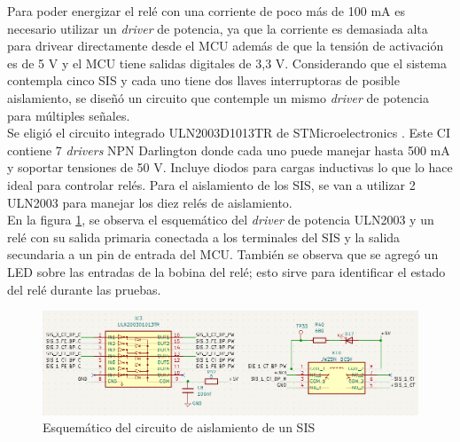 Para poder energizar el relé con una corriente de poco más de 100 mA es necesario utilizar un \textit{driver} de potencia, ya que la corriente es demasiada alta para drivear directamente desde el MCU además de que la tensión de activación es de 5 V y el MCU tiene salidas digitales de 3,3 V. Considerando que el sistema contempla cinco SIS y cada uno tiene dos llaves interruptoras de posible aislamiento, se diseñó un circuito que contemple un mismo \textit{driver} de potencia para múltiples señales. \\

Se eligió el circuito integrado ULN2003D1013TR de STMicroelectronics \cite{ULN2003D1013TR}. Este CI contiene 7 \textit{drivers} NPN Darlington \cite{darlington} donde cada uno puede manejar hasta 500 mA y soportar tensiones de 50 V. Incluye diodos para cargas inductivas lo que lo hace ideal para controlar relés. Para el aislamiento de los SIS, se van a utilizar 2 ULN2003 para manejar los diez relés de aislamiento. \\

En la figura \ref{fig:sis_aislamiento}, se observa el esquemático del \textit{driver} de potencia ULN2003 y un relé con su salida primaria conectada a los terminales del SIS y la salida secundaria a un pin de entrada del MCU. También se observa que se agregó un LED sobre las entradas de la bobina del relé; esto sirve para identificar el estado del relé durante las pruebas. 



\begin{figure}[H]
    \centering
    \includegraphics[width = \linewidth]{img/sis_aislamiento.png}
    \caption{Esquemático del circuito de aislamiento de un SIS}
    \label{fig:sis_aislamiento}
\end{figure}


